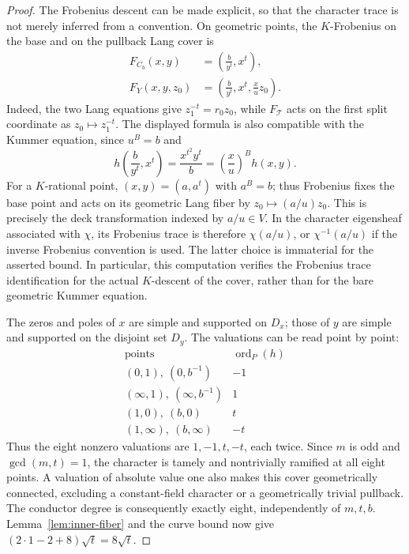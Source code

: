 \documentclass[11pt]{article}
\begin{document}
\begin{proof}
The Frobenius descent can be made explicit, so that the character
trace is not merely inferred from a convention.  On geometric points,
the $K$-Frobenius on the base and on the pullback Lang cover is
\begin{equation}\label{eq:inner-lang-frobenius}
 \begin{aligned}
 F_{C_b}(x,y)&=\left(\frac b{y^t},x^t\right),\\
 F_Y(x,y,z_0)&=\left(\frac b{y^t},x^t,\frac xu z_0\right).
 \end{aligned}
\end{equation}
Indeed, the two Lang equations give $z_1^{-t}=r_0z_0$, while
$F_{\mathcal T}$ acts on the first split coordinate as
$z_0\mapsto z_1^{-t}$.  The displayed formula is also compatible
with the Kummer equation, since $u^B=b$ and
\[
 h\left(\frac b{y^t},x^t\right)
  =\frac{x^{t^2}y^t}{b}
  =\left(\frac xu\right)^B h(x,y).
\]
For a $K$-rational point, $(x,y)=(a,a^t)$ with $a^B=b$;
thus Frobenius fixes the base point and acts on its geometric
Lang fiber by $z_0\mapsto(a/u)z_0$.  This is precisely the deck
transformation indexed by $a/u\in V$.  In the character eigensheaf
associated with $\chi$, its Frobenius trace is therefore
$\chi(a/u)$, or $\chi^{-1}(a/u)$ if the inverse Frobenius convention
is used.  The latter choice is immaterial for the asserted bound.
In particular, this computation verifies the Frobenius trace
identification for the actual $K$-descent of the cover, rather
than for the bare geometric Kummer equation.

The zeros and poles of $x$ are simple and supported on $D_x$;
those of $y$ are simple and supported on the disjoint set $D_y$.
The valuations can be read point by point:
\[
 \begin{array}{c|c}
 \text{points}&\operatorname{ord}_P(h)\\\hline
 (0,1),\ (0,b^{-1})&-1\\
 (\infty,1),\ (\infty,b^{-1})&1\\
 (1,0),\ (b,0)&t\\
 (1,\infty),\ (b,\infty)&-t
 \end{array}
\]
Thus the eight nonzero valuations are $1,-1,t,-t$, each twice.
Since $m$ is odd and $\gcd(m,t)=1$, the character is tamely and
nontrivially ramified at all eight points. A valuation of absolute
value one also makes this cover geometrically connected, excluding
a constant-field character or a geometrically trivial pullback.
The conductor degree is consequently exactly eight, independently
of $m,t,b$. Lemma~\ref{lem:inner-fiber} and the curve bound now give
$(2\cdot1-2+8)\sqrt t=8\sqrt t$.
\end{proof}
\end{document}
